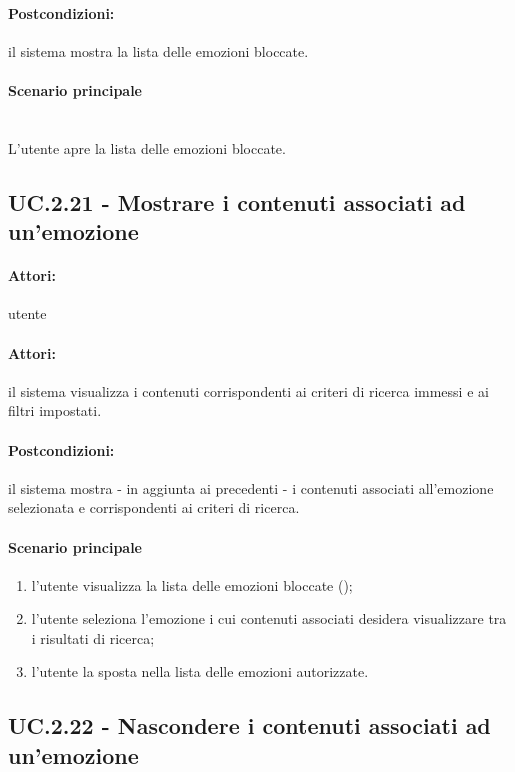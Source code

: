 \documentclass[10pt,a4paper,headinclude,footinclude,hidelinks]{scrreprt} %
\begin{document}
	\paragraph{Postcondizioni:} il sistema mostra la lista delle emozioni bloccate.
	\paragraph{Scenario principale} \hfill \\
	L'utente apre la lista delle emozioni bloccate.

	\subsection[UC.2.21]{UC.2.21 - Mostrare i contenuti associati ad un'emozione}
	\label{sec:stage:ar:uc:2_21}
	\paragraph{Attori:} utente
	\paragraph{Attori:} il sistema visualizza i contenuti corrispondenti ai criteri di ricerca immessi e ai filtri impostati.
	\paragraph{Postcondizioni:} il sistema mostra - in aggiunta ai precedenti - i contenuti associati all'emozione selezionata e corrispondenti ai criteri di ricerca.
	\paragraph{Scenario principale}
	\begin{enumerate}
	\item l'utente visualizza la lista delle emozioni bloccate ();
	\item l'utente seleziona l'emozione i cui contenuti associati desidera visualizzare tra i risultati di ricerca;
	\item l'utente la sposta nella lista delle emozioni autorizzate.
	\end{enumerate}

	\subsection[UC.2.22]{UC.2.22 - Nascondere i contenuti associati ad un'emozione}
	\label{sec:stage:ar:uc:2_22}
\end{document}
